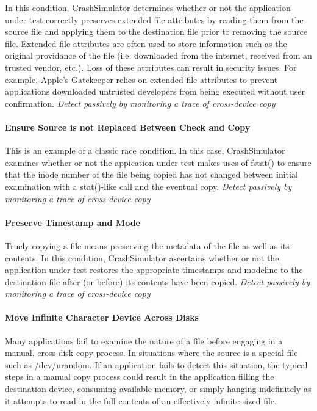         In this condition, CrashSimulator determines whether or not the application under test correctly preserves
        extended file attributes by reading them from the source file and applying them to the destination file prior to
        removing the source file.  Extended file attributes are often used to store information such as the original
        providance of the file (i.e. downloaded from the internet, received from an trusted vendor, etc.).  Loss of
        these attributes can result in security issues. For example, Apple's Gatekeeper relies on extended file
        attributes to prevent applications downloaded untrusted developers from being executed without user
        confirmation. \emph{Detect passively by monitoring a trace of cross-device copy}


        \paragraph{Ensure Source is not Replaced Between Check and Copy}

        This is an example of a classic race condition.  In this case, CrashSimulator examines whether or not the
        appication under test makes uses of fstat() to ensure that the inode number of the file being copied has not
        changed between initial examination with a stat()-like call and the eventual copy. \emph{Detect passively by
          monitoring a trace of cross-device copy}

        \paragraph{Preserve Timestamp and Mode}

        Truely copying a file means preserving the metadata of the file as well as its contents.  In this condition,
        CrashSimulator ascertains whether or not the application under test restores the appropriate timestamps and
        modeline to the destination file after (or before) its contents have been copied. \emph{Detect passively by
          monitoring a trace of cross-device copy}

        \paragraph{Move Infinite Character Device Across Disks}

        Many applications fail to examine the nature of a file before engaging in a manual, cross-disk copy process.  In
        situations where the source is a special file such as /dev/urandom.  If an application fails to detect this
        situation, the typical steps in a manual copy process could result in the application filling the destination
        device, consuming available memory, or simply hanging indefinitely as it attempts to read in the full contents
        of an effectively infinite-sized file.

